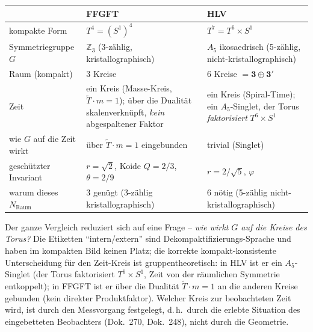 \begin{center}\small
\renewcommand{\arraystretch}{1.3}
\begin{tabular}{@{}p{3.5cm} p{4.4cm} p{4.7cm}@{}}
\toprule
 & \textbf{FFGFT} & \textbf{HLV} \\
\midrule
kompakte Form & $T^4=(S^1)^4$ & $T^7=T^6\times S^1$ \\
Symmetriegruppe $G$ & $\mathbb{Z}_3$ (3-zählig, kristallographisch) & $A_5$ ikosaedrisch (5-zählig, nicht-kristallographisch) \\
Raum (kompakt) & $3$ Kreise & $6$ Kreise $=\mathbf{3}\oplus\mathbf{3'}$ \\
Zeit & ein Kreis (Masse-Kreis, $\tilde{T}\cdot m=1$); über die Dualität skalenverknüpft, \emph{kein} abgespaltener Faktor & ein Kreis (Spiral-Time); ein $A_5$-Singlet, der Torus \emph{faktorisiert} $T^6\times S^1$ \\
wie $G$ auf die Zeit wirkt & über $\tilde{T}\cdot m=1$ eingebunden & trivial (Singlet) \\
geschützter Invariant & $r=\sqrt2$, Koide $Q=2/3$, $\theta=2/9$ & $r=2/\sqrt5$, $\varphi$ \\
warum dieses $N_\text{Raum}$ & $3$ genügt (3-zählig kristallographisch) & $6$ nötig (5-zählig nicht-kristallographisch) \\
\bottomrule
\end{tabular}
\end{center}

Der ganze Vergleich reduziert sich auf eine Frage -- \emph{wie wirkt $G$ auf die Kreise des
Torus?} Die Etiketten ``intern/extern'' sind Dekompaktifizierungs-Sprache und haben im
kompakten Bild keinen Platz; die korrekte kompakt-konsistente Unterscheidung für den
Zeit-Kreis ist gruppentheoretisch: in HLV ist er ein $A_5$-Singlet (der Torus faktorisiert
$T^6\times S^1$, Zeit von der räumlichen Symmetrie entkoppelt); in FFGFT ist er über die
Dualität $\tilde{T}\cdot m=1$ an die anderen Kreise gebunden (kein direkter
Produktfaktor). Welcher Kreis zur beobachteten Zeit wird, ist durch den Messvorgang
festgelegt, d.\,h.\ durch die erlebte Situation des eingebetteten Beobachters (Dok.~270,
Dok.~248), nicht durch die Geometrie.

